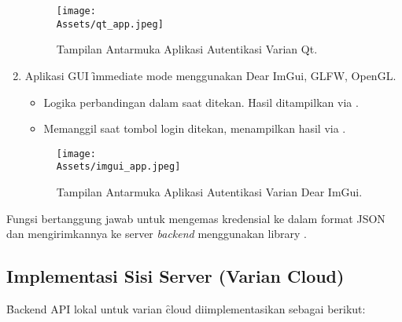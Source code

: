 \begin{enumerate}
\begin{itemize}
	      \end{itemize}
        \begin{figure}[H]
	          \centering
	          \texttt{[image: \\Assets/qt\_app.jpeg]} %
	          \caption{Tampilan Antarmuka Aplikasi Autentikasi Varian Qt.}
	          \label{fig:qt_app_ui}
	      \end{figure}
	\item {} Aplikasi GUI \f{immediate mode} menggunakan Dear ImGui, GLFW, OpenGL.
	      \begin{itemize}
		      \item {} Logika perbandingan dalam  saat  ditekan. Hasil ditampilkan via .
		      \item {} Memanggil  saat tombol login ditekan, menampilkan hasil via .
	      \end{itemize}
        \begin{figure}[H]
	          \centering
	          \texttt{[image: \\Assets/imgui\_app.jpeg]} %
	          \caption{Tampilan Antarmuka Aplikasi Autentikasi Varian Dear ImGui.}
	          \label{fig:imgui_app_ui}
	      \end{figure}
\end{enumerate}

Fungsi  bertanggung jawab untuk mengemas kredensial ke dalam format JSON dan mengirimkannya ke server \textit{backend} menggunakan library . 

\subsection{Implementasi Sisi Server (Varian Cloud)}
\f{Backend} API lokal untuk varian \f{cloud} diimplementasikan sebagai berikut:

